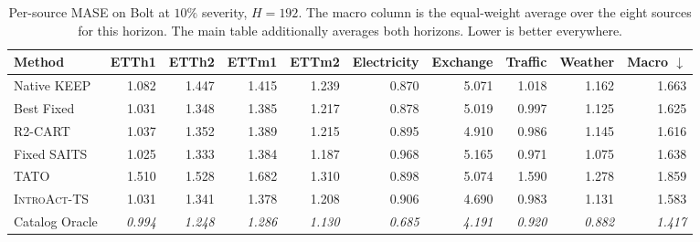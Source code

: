 \documentclass{article}
\newcommand{\oracle}[1]{\textit{\textcolor{phgray}{#1}}}
\newcommand{\introact}{\textsc{IntroAct-TS}}
\begin{document}
\begin{table}[!t]
  \caption{Per-source MASE on Bolt at $10\%$ severity, $H=192$. The macro column is the
  equal-weight average over the eight sources for this horizon. The main table additionally averages both horizons. Lower is better everywhere.}
  \label{tab:app-src-bolt-192}
  \centering
  \small
  \setlength{\tabcolsep}{3pt}
\begin{tabular*}{\textwidth}{@{\extracolsep{\fill}}lrrrrrrrrr@{}}
    \toprule
    Method & ETTh1 & ETTh2 & ETTm1 & ETTm2 & Electricity & Exchange & Traffic & Weather & Macro $\downarrow$ \\
    \midrule
    Native KEEP & 1.082 & 1.447 & 1.415 & 1.239 & 0.870 & 5.071 & 1.018 & 1.162 & 1.663 \\
    Best Fixed & 1.031 & 1.348 & 1.385 & 1.217 & 0.878 & 5.019 & 0.997 & 1.125 & 1.625 \\
    R2-CART & 1.037 & 1.352 & 1.389 & 1.215 & 0.895 & 4.910 & 0.986 & 1.145 & 1.616 \\
    Fixed SAITS & 1.025 & 1.333 & 1.384 & 1.187 & 0.968 & 5.165 & 0.971 & 1.075 & 1.638 \\
    TATO & 1.510 & 1.528 & 1.682 & 1.310 & 0.898 & 5.074 & 1.590 & 1.278 & 1.859 \\
    \midrule
    \rowcolor{bestgray}\introact{} & 1.031 & 1.341 & 1.378 & 1.208 & 0.906 & 4.690 & 0.983 & 1.131 & 1.583 \\
    \midrule
    Catalog Oracle & \oracle{0.994} & \oracle{1.248} & \oracle{1.286} & \oracle{1.130} & \oracle{0.685} & \oracle{4.191} & \oracle{0.920} & \oracle{0.882} & \oracle{1.417} \\
    \bottomrule
  \end{tabular*}
\end{table}
\end{document}
